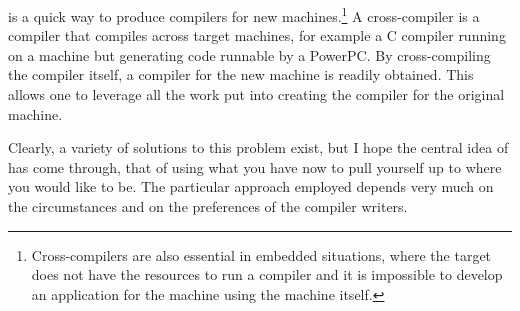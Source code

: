  is a quick way to produce compilers for new machines.\footnote{Cross-compilers are also essential in embedded situations, where the target does not have the resources to run a compiler and it is impossible to develop an application for the machine using the machine itself.} A cross-compiler is a compiler that compiles across target machines, for example a C compiler running on a  machine but generating code runnable by a PowerPC. By cross-compiling the compiler itself, a compiler for the new machine is readily obtained. This allows one to leverage all the work put into creating the compiler for the original machine.

Clearly, a variety of solutions to this problem exist, but I hope the central idea of  has come through, that of using what you have now to pull yourself up to where you would like to be. The particular approach employed depends very much on the circumstances and on the preferences of the compiler writers.
